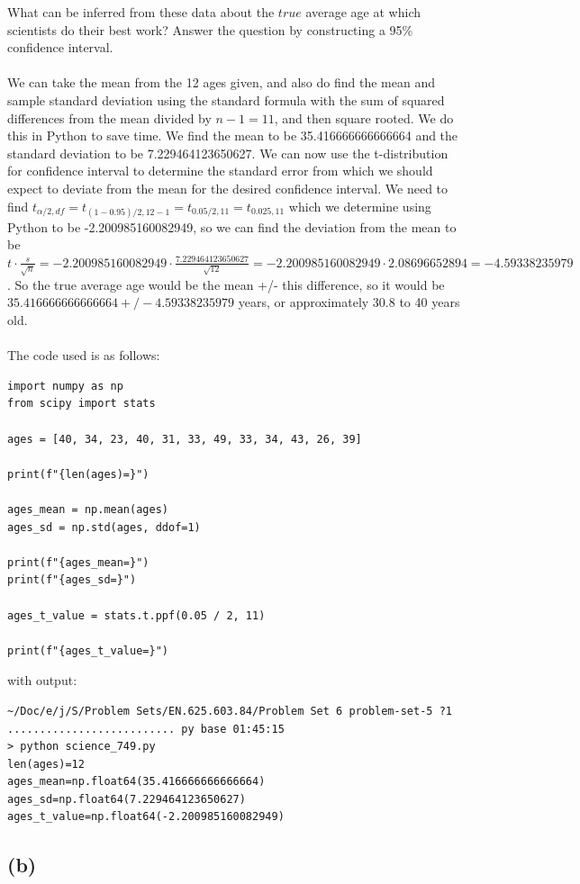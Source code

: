 \documentclass{article}
\begin{document}
{What can be inferred from these data about the \(true\) average age at which scientists do their best work? Answer the question by constructing a 95\% confidence interval.
\\
\\
We can take the mean from the 12 ages given, and also do find the mean and sample standard deviation using the standard formula with the sum of squared differences from the mean divided by \(n - 1 = 11\), and then square rooted. We do this in Python to save time. We find the mean to be 35.416666666666664 and the standard deviation to be 7.229464123650627. We can now use the t-distribution for confidence interval to determine the standard error from which we should expect to deviate from the mean for the desired confidence interval. We need to find \(t_{\alpha / 2, df} = t_{(1 - 0.95) / 2, 12 - 1} = t_{0.05 / 2, 11} = t_{0.025, 11}\) which we determine using Python to be -2.200985160082949, so we can find the deviation from the mean to be \(t \cdot \frac{s}{\sqrt{n}} = -2.200985160082949 \cdot \frac{7.229464123650627}{\sqrt{12}} = -2.200985160082949 \cdot 2.08696652894 = -4.59338235979 \). So the true average age would be the mean +/- this difference, so it would be \(35.416666666666664 +/- 4.59338235979\) years, or approximately 30.8 to 40 years old.
\\
\\
The code used is as follows:
\begin{verbatim}
import numpy as np
from scipy import stats

ages = [40, 34, 23, 40, 31, 33, 49, 33, 34, 43, 26, 39]

print(f"{len(ages)=}")

ages_mean = np.mean(ages)
ages_sd = np.std(ages, ddof=1)

print(f"{ages_mean=}")
print(f"{ages_sd=}")

ages_t_value = stats.t.ppf(0.05 / 2, 11)

print(f"{ages_t_value=}")
\end{verbatim}
with output:
\begin{verbatim}
~/Doc/e/j/S/Problem Sets/EN.625.603.84/Problem Set 6 problem-set-5 ?1 .......................... py base 01:45:15
> python science_749.py
len(ages)=12
ages_mean=np.float64(35.416666666666664)
ages_sd=np.float64(7.229464123650627)
ages_t_value=np.float64(-2.200985160082949)
\end{verbatim}

\subsection*{(b)}

}
\end{document}
